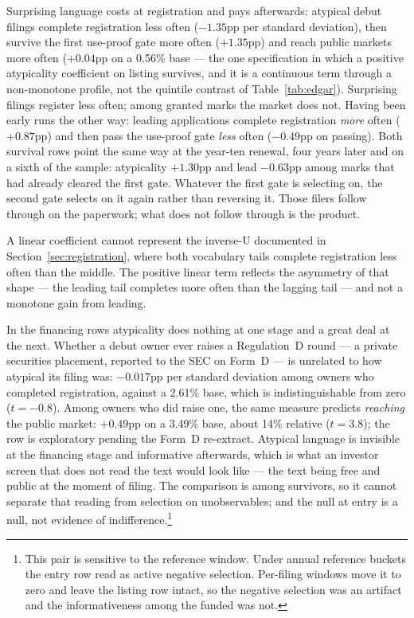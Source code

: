 

Surprising language costs at registration and
pays afterwards: atypical debut filings complete registration less often
($-1.35$pp per standard deviation), then survive the first use-proof gate
more often ($+1.35$pp) and reach public markets more often ($+0.04$pp on a
0.56\% base --- the one specification in which a positive atypicality
coefficient on listing survives, and it is a continuous term through a
non-monotone profile, not the quintile contrast of Table~\ref{tab:edgar}). Surprising filings register less often; among granted marks the market does
not. Having been early runs the other way: leading applications complete
registration \emph{more} often ($+0.87$pp) and then pass the use-proof gate
\emph{less} often ($-0.49$pp on passing). Both survival rows point the same
way at the year-ten renewal, four years later and on a sixth of the
sample: atypicality $+1.30$pp and lead $-0.63$pp among marks that had
already cleared the first gate. Whatever the first gate is selecting on,
the second gate selects on it again rather than reversing it. Those filers follow through on the paperwork;
what does not follow through is the product.

A linear coefficient cannot represent the inverse-U documented in Section~\ref{sec:registration}, where
both vocabulary tails complete registration less often than the middle. The
positive linear term reflects the asymmetry of that shape --- the leading
tail completes more often than the lagging tail --- and not a monotone gain
from leading.

In the financing rows atypicality does nothing at one stage and a great deal
at the next. Whether a debut owner
ever raises a Regulation~D round --- a private securities placement,
reported to the SEC on Form~D --- is unrelated to how atypical its filing
was: $-0.017$pp per standard deviation among owners who completed
registration, against a 2.61\% base, which is indistinguishable from zero
($t = -0.8$). Among owners who did raise one, the same measure predicts
\emph{reaching} the public market: $+0.49$pp on a 3.49\% base, about 14\%
relative ($t = 3.8$); the row is exploratory pending the Form~D
re-extract. Atypical language is invisible at the financing stage
and informative afterwards, which is what an investor screen that does not
read the text would look like --- the text being free and public at the
moment of filing. The comparison is among survivors, so it cannot separate
that reading from selection on unobservables; and the null at entry is a
null, not evidence of indifference.\footnote{This pair is sensitive to the
reference window. Under annual reference buckets the entry row read as
active negative selection. Per-filing
windows move it to zero and leave the listing row intact, so the negative
selection was an artifact and the informativeness among the funded was
not.}

